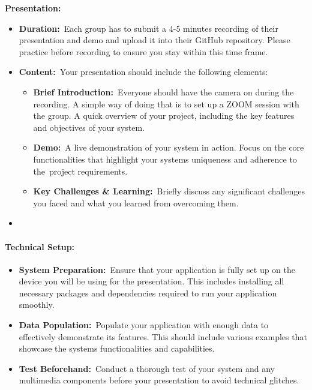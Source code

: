 \documentclass[
]{article}
\providecommand{\tightlist}{%
  \setlength{\itemsep}{0pt}\setlength{\parskip}{0pt}}
\begin{document}
\textbf{Presentation:}

\begin{itemize}
\tightlist
\item
  \textbf{Duration:}~Each group has to submit a 4-5 minutes recording of
  their presentation and demo and upload it into their GitHub
  repository. Please practice before recording to ensure you stay within
  this time frame.
\item
  \textbf{Content:}~Your presentation should include the following
  elements:

  \begin{itemize}
  \tightlist
  \item
    \textbf{Brief Introduction:}~Everyone should have the camera on
    during the recording. A simple way of doing that is to set up a ZOOM
    session with the group. A quick overview of your project, including
    the key features and objectives of your system.
  \item
    \textbf{Demo:}~A live demonstration of your system in action. Focus
    on the core functionalities that highlight your
    system\textquotesingle s uniqueness and adherence to the~project
    requirements.
  \item
    \textbf{Key Challenges \& Learning:}~Briefly discuss any significant
    challenges you faced and what you learned from overcoming them.
  \end{itemize}
\item
\end{itemize}

\paragraph{\texorpdfstring{\textbf{Technical
Setup:}}{Technical Setup:}}\label{technical-setup}

\begin{itemize}
\tightlist
\item
  \textbf{System Preparation:}~Ensure that your application is fully set
  up on the device you will be using for the presentation. This includes
  installing all necessary packages and dependencies required to run
  your application smoothly.
\item
  \textbf{Data Population:}~Populate your application with enough data
  to effectively demonstrate its features. This should include various
  examples that showcase the system\textquotesingle s functionalities
  and capabilities.
\item
  \textbf{Test Beforehand:}~Conduct a thorough test of your system and
  any multimedia components before your presentation to avoid technical
  glitches.
\end{itemize}
\end{document}

